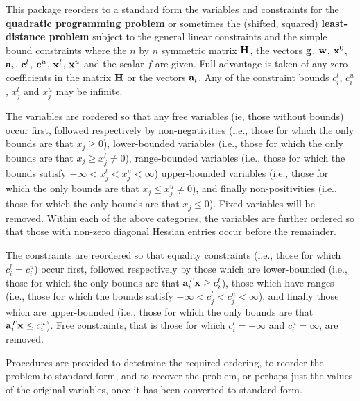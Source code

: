 \documentclass{galahad}
\begin{document}
\galheader


\galsummary
This package reorders to a standard form the variables and constraints
for the {\bf quadratic programming problem}
or sometimes the (shifted, squared) {\bf least-distance problem}
subject to the general linear constraints
and the simple bound constraints
where the $n$ by $n$ symmetric matrix ${\mathbf{H}}$, the
vectors ${\mathbf{g}}$, ${\mathbf{w}}$, ${\mathbf{x}}^{0}$,
${\mathbf{a}}_{i}$, ${\mathbf{c}}^{l}$, ${\mathbf{c}}^{u}$, ${\mathbf{x}}^{l}$,
${\mathbf{x}}^{u}$ and the scalar $f$ are given.
Full advantage is taken of any zero coefficients in the matrix ${\mathbf{H}}$ or the
vectors ${\mathbf{a}}_{i}$.
Any of the constraint bounds $c_{i}^{l}$, $c_{i}^{u}$,
$x_{j}^{l}$ and $x_{j}^{u}$ may be infinite.

The variables are rordered so that any
free variables (ie, those without bounds) occur first, followed
respectively by
non-negativities (i.e., those for which the only
bounds are that $x_j \geq 0$),
lower-bounded variables (i.e., those for which the only
bounds are that $x_j \geq x_j^l \neq 0$),
range-bounded variables (i.e., those for which the
bounds satisfy $- \infty < x_j^l < x_j^u < \infty$)
upper-bounded variables (i.e., those for which the only
bounds are that $x_j \leq x_j^u \neq 0$), and finally
non-positivities (i.e., those for which the only
bounds are that $x_j \leq 0$).
Fixed variables will be removed. Within each of the above categories,
the variables are further ordered so that those with non-zero diagonal Hessian
entries occur before the remainder.

The constraints are reordered so that equality constraints (i.e., those
for which $c_i^l = c_i^u$) occur first, followed
respectively by those
which are lower-bounded (i.e., those for which the only
bounds are that ${\mathbf{a}}_i^T {\mathbf{x}} \geq c_i^l$),
those which have ranges (i.e., those for which the
bounds satisfy
$- \infty < c_j^l < c_j^u < \infty$),
and finally those which are upper-bounded (i.e., those for which the only
bounds are that ${\mathbf{a}}_i^T {\mathbf{x}} \leq c_i^u$).
Free constraints, that is those for which
$c_i^l = - \infty$ and $c_i^u = \infty$, are removed.

Procedures are provided to detetmine the required ordering, to
reorder the problem to standard form, and
to recover the problem, or perhaps just the values of
the original variables, once it has been converted to standard form.
\end{document}
